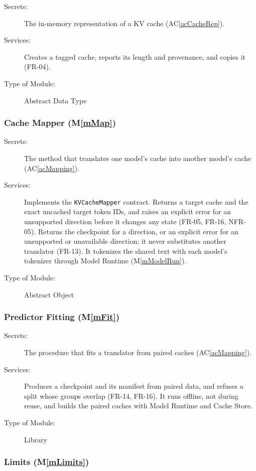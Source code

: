 \documentclass[12pt, titlepage]{article}
\newcommand{\acref}[1]{AC\ref{#1}}
\newcommand{\mref}[1]{M\ref{#1}}
\begin{document}
\begin{description}
\item[Secrets:] The in-memory representation of a KV cache (\acref{acCacheRep}).
\item[Services:] Creates a tagged cache, reports its length and provenance, and
  copies it (FR-04).
\item[Type of Module:] Abstract Data Type
\end{description}

\subsubsection{Cache Mapper (\mref{mMap})}

\begin{description}
\item[Secrets:] The method that translates one model's cache into another model's cache (\acref{acMapping}).
\item[Services:] Implements the \texttt{KVCacheMapper} contract. Returns a target
  cache and the exact uncached target token IDs, and raises an explicit error
  for an unsupported direction before it changes any state (FR-05, FR-16,
  NFR-05). Returns the checkpoint for a direction, or an explicit error for an
  unsupported or unavailable direction; it never substitutes another
  translator (FR-13). It tokenizes the shared text with each model's tokenizer
  through Model Runtime (\mref{mModelRun}).
\item[Type of Module:] Abstract Object
\end{description}

\subsubsection{Predictor Fitting (\mref{mFit})}

\begin{description}
\item[Secrets:] The procedure that fits a translator from paired caches (\acref{acMapping}).
\item[Services:] Produces a checkpoint and its manifest from paired data, and
  refuses a split whose groups overlap (FR-14, FR-16). It runs offline, not
  during reuse, and builds the paired caches with Model Runtime and Cache Store.
\item[Type of Module:] Library
\end{description}

\subsubsection{Limits (\mref{mLimits})}
\end{document}
